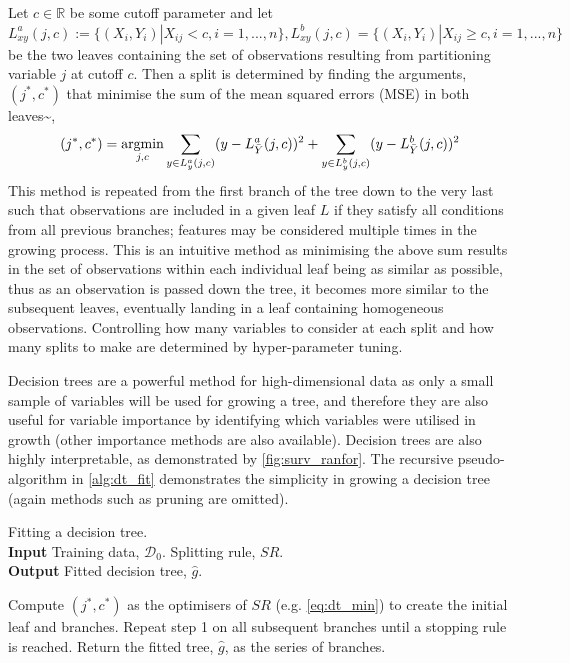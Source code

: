 \documentclass[
  letterpaper,
]{scrbook}
\theoremstyle{plain}
\theoremstyle{definition}
\theoremstyle{remark}
\begin{document}
Let \(c \in \mathbb{R}\) be some cutoff parameter and let
\(L^a_{xy}(j,c) := \{(X_i,Y_i)|X_{ij} < c, i = 1,...,n\}, L^b_{xy}(j,c) = \{(X_i,Y_i)|X_{ij} \geq c, i = 1,...,n\}\)
be the two leaves containing the set of observations resulting from
partitioning variable \(j\) at cutoff \(c\). Then a split is determined
by finding the arguments, \((j^*,c^*)\) that minimise the sum of the
mean squared errors (MSE) in both
leaves\textasciitilde{}\cite{Hastie2013}, \[
(j^*, c^*) = \operatornamewithlimits{argmin}_{j, c} \sum_{y \in L^a_{y}(j,c)} (y - L^a_{\bar{Y}}(j,c))^2 + \sum_{y \in L^b_{y}(j,c)} (y - L^b_{\bar{Y}}(j,c))^2
\label{eq:dt_min}
\] This method is repeated from the first branch of the tree down to the
very last such that observations are included in a given leaf \(L\) if
they satisfy all conditions from all previous branches; features may be
considered multiple times in the growing process. This is an intuitive
method as minimising the above sum results in the set of observations
within each individual leaf being as similar as possible, thus as an
observation is passed down the tree, it becomes more similar to the
subsequent leaves, eventually landing in a leaf containing homogeneous
observations. Controlling how many variables to consider at each split
and how many splits to make are determined by hyper-parameter tuning.

Decision trees are a powerful method for high-dimensional data as only a
small sample of variables will be used for growing a tree, and therefore
they are also useful for variable importance by identifying which
variables were utilised in growth (other importance methods are also
available). Decision trees are also highly interpretable, as
demonstrated by \ref{fig:surv_ranfor}. The recursive pseudo-algorithm in
\ref{alg:dt_fit} demonstrates the simplicity in growing a decision tree
(again methods such as pruning are omitted).

\begin{algorithm}
\caption{Fitting a decision tree. \\
\textbf{Input} Training data, $\mathcal{D}_0$. Splitting rule, $SR$. \\
\textbf{Output} Fitted decision tree, $\hat{g}$.}\label{alg:dt_fit}
\begin{algorithmic}[1]
\State Compute $(j^*, c^*)$ as the optimisers of $SR$ (e.g. \ref{eq:dt_min}) to create the initial leaf and branches.
\State Repeat step 1 on all subsequent branches until a stopping rule is reached.
\State Return the fitted tree, $\hat{g}$, as the series of branches.
\end{algorithmic}
\end{algorithm}
\end{document}
